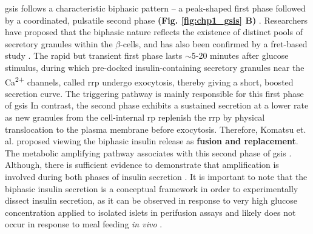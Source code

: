 \par \gls{gsis} follows a characteristic biphasic pattern – a peak-shaped first phase followed by a coordinated, pulsatile second phase \textbf{(Fig. \ref{fig:chp1_gsis} B)} \textbf{\cite{ashcroft_diabetes_2012,grodsky_threshold_1972,komatsu_glucosestimulated_2013}}. Researchers have proposed that the biphasic nature reflects the existence of distinct pools of secretory granules within the $\beta$-cells, and has also been confirmed by a \gls{fret}-based study \textbf{\cite{ashcroft_diabetes_2012,takahashi_snare_2010}}. The rapid but transient first phase lasts $\sim$5-20 minutes after glucose stimulus, during which pre-docked insulin-containing secretory granules near the Ca\textsuperscript{2+} channels, called \gls{rrp} undergo exocytosis, thereby giving a short, boosted secretion curve. The triggering pathway is mainly responsible for this first phase of \gls{gsis} \textbf{\cite{kalwat_mechanisms_2017,campbell_mechanisms_2021}} %
In contrast, the second phase exhibits a sustained secretion at a lower rate as new granules from the cell-internal \gls{rp} replenish the \gls{rrp} by physical translocation to the plasma membrane before exocytosis. Therefore, Komatsu et. al. \textbf{\cite{komatsu_glucosestimulated_2013}} proposed viewing the biphasic insulin release as \textbf{fusion and replacement}. The metabolic amplifying pathway associates with this second phase of \gls{gsis} \textbf{\cite{kalwat_mechanisms_2017,campbell_mechanisms_2021}}. Although, there is sufficient evidence to demonstrate that amplification is involved during both phases of insulin secretion \textbf{\cite{mourad_metabolic_2010,mourad_metabolic_2011}}. It is important to note that the biphasic insulin secretion is a conceptual framework in order to experimentally dissect insulin secretion, as it can be observed in response to very high glucose concentration applied to isolated islets in perifusion assays and likely does not occur in response to meal feeding \textit{in vivo} \textbf{\cite{aizawa_rab27a_2005}}.\\


